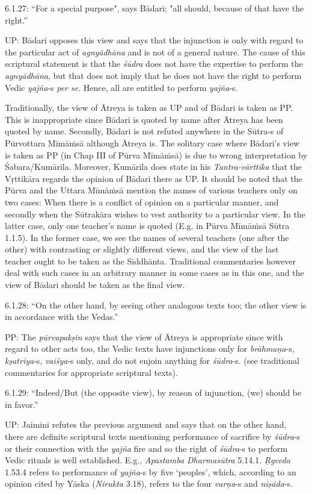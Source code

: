 6.1.27: “For a special purpose", says Bādari; "all should, because of that have the right.”

UP: Bādari opposes this view and says that the injunction is only with regard to the particular act of \textit{agnyādhāna} and is not of a general nature. The cause of this scriptural statement is that the \textit{śūdra} does not have the expertise to perform the \textit{agnyādhāna}, but that does not imply that he does not have the right to perform Vedic \textit{yajña}-s \textit{per se}. Hence, all are entitled to perform \textit{yajña}-s.

Traditionally, the view of Ātreya is taken as UP and of Bādari is taken as PP. This is inappropriate since Bādari is quoted by name after Ātreya has been quoted by name. Secondly, Bādari is not refuted anywhere in the Sūtra-s of Pūrvottara Mīmāṁsā although Ātreya is. The solitary case where Bādari’s view is taken as PP (in Chap III of Pūrva Mīmāṁsā) is due to wrong interpretation by Śabara/Kumārila. Moreover, Kumārila does state in his \textit{Tantra-vārttika} that the Vṛttikāra regards the opinion of Bādari there as UP. It should be noted that the Pūrva and the Uttara Mīmāṁsā mention the names of various teachers only on two cases: When there is a conflict of opinion on a particular manner, and secondly when the Sūtrakāra wishes to vest authority to a particular view. In the latter case, only one teacher’s name is quoted (E.g. in Pūrva Mīmāṁsā Sūtra 1.1.5). In the former case, we see the names of several teachers (one after the other) with contrasting or slightly different views, and the view of the last teacher ought to be taken as the Siddhānta. Traditional commentaries however deal with such cases in an arbitrary manner in some cases as in this one, and the view of Bādari should be taken as the final view.

6.1.28: “On the other hand, by seeing other analogous texts too; the other view is in accordance with the Vedas.”

PP: The \textit{pūrvapakṣin} says that the view of Ātreya is appropriate since with regard to other acts too, the Vedic texts have injunctions only for \textit{brāhmaṇa}-s, \textit{kṣatriya}-s, \textit{vaiśya}-s only, and do not enjoin anything for \textit{śūdra}-s. (see traditional commentaries for appropriate scriptural texts).

6.1.29: “Indeed/But (the opposite view), by reason of injunction, (we) should be in favor.”

UP: Jaimini refutes the previous argument and says that on the other hand, there are definite scriptural texts mentioning performance of sacrifice by \textit{śūdra}-s or their connection with the \textit{yajña} fire and so the right of \textit{śūdra}-s to perform Vedic rituals is well established. E.g., \textit{Apastamba Dharmasūtra} 5.14.1. \textit{Ṛgveda} 1.53.4 refers to performance of \textit{yajña}-s by five ‘peoples’, which, according to an opinion cited by Yāska (\textit{Nirukta} 3.18), refers to the four \textit{varṇa}-s and \textit{niṣāda}-s.

